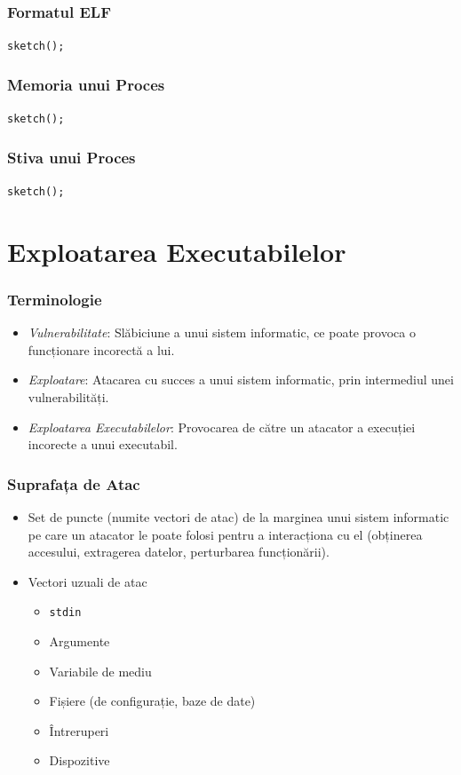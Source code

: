 \documentclass[xcolor={table}]{beamer}
\begin{document}
	\begin{frame}
		\frametitle{Formatul ELF}\pause
        \centering
        \texttt{sketch();}
	\end{frame}
	
	\begin{frame}
		\frametitle{Memoria unui Proces}\pause
		\centering
        \texttt{sketch();}
	\end{frame}
	
	\begin{frame}
		\frametitle{Stiva unui Proces}\pause
		\centering
        \texttt{sketch();}
	\end{frame}
	
	\section{Exploatarea Executabilelor}
	
	\begin{frame}
		\frametitle{Terminologie}\pause
		\begin{itemize}[<+->]
		    \item \textit{Vulnerabilitate}: Slăbiciune a unui sistem informatic, ce poate provoca o funcționare incorectă a lui.
			\item \textit{Exploatare}: Atacarea cu succes a unui sistem informatic, prin intermediul unei vulnerabilități.
		    \item \textit{Exploatarea Executabilelor}: Provocarea de către un atacator a execuției incorecte a unui executabil.
		\end{itemize}
	\end{frame}
	
	\begin{frame}
		\frametitle{Suprafața de Atac}\pause
		\begin{itemize}[<+->]
		    \item Set de puncte (numite vectori de atac) de la marginea unui sistem informatic  pe care un atacator le poate folosi pentru a interacționa cu el (obținerea accesului, extragerea datelor, perturbarea funcționării).
		    \item Vectori uzuali de atac
    		    \begin{itemize}
        		    \item \texttt{stdin}
        		    \item Argumente
        		    \item Variabile de mediu
        		    \item Fișiere (de configurație, baze de date)
        		    \item Întreruperi
        		    \item Dispozitive
    		    \end{itemize}
		\end{itemize}
	\end{frame}
	
\end{document}
